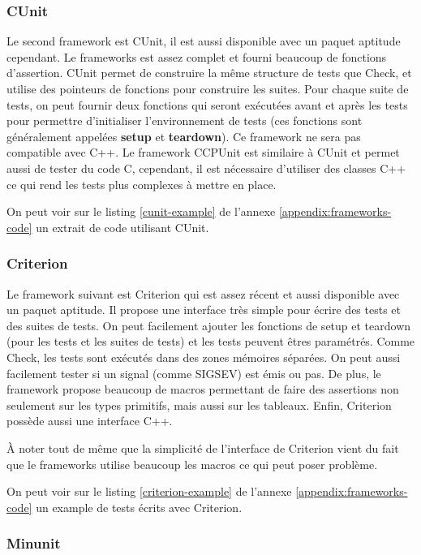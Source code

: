 \documentclass[a4paper]{article}
\begin{document}
\subsubsection*{CUnit}

Le second framework est CUnit, il est aussi disponible avec un paquet aptitude
cependant. Le frameworks est assez complet et fourni beaucoup de fonctions
d'assertion. CUnit permet de construire la même structure de tests que Check, et
utilise des pointeurs de fonctions pour construire les suites. Pour chaque suite
de tests, on peut fournir deux fonctions qui seront exécutées avant et après les
tests pour permettre d'initialiser l'environnement de tests (ces fonctions sont
généralement appelées \textbf{setup} et \textbf{teardown}). Ce framework ne sera
pas compatible avec C++. Le framework CCPUnit est similaire à CUnit et permet
aussi de tester du code C, cependant, il est nécessaire d'utiliser des classes
C++ ce qui rend les tests plus complexes à mettre en place.

On peut voir sur le listing \ref{cunit-example} de l'annexe
\ref{appendix:frameworks-code} un extrait de code utilisant CUnit.

\subsubsection*{Criterion}

Le framework suivant est Criterion qui est assez récent et aussi disponible avec
un paquet aptitude. Il propose une interface très simple pour écrire des tests
et des suites de tests. On peut facilement ajouter les fonctions de setup et
teardown (pour les tests et les suites de tests) et les tests peuvent êtres
paramétrés. Comme Check, les tests sont exécutés dans des zones mémoires
séparées. On peut aussi facilement tester si un signal (comme SIGSEV) est émis
ou pas. De plus, le framework propose beaucoup de macros permettant de faire des
assertions non seulement sur les types primitifs, mais aussi sur les tableaux.
Enfin, Criterion possède aussi une interface C++.

À noter tout de même que la simplicité de l'interface de Criterion vient du fait
que le frameworks utilise beaucoup les macros ce qui peut poser problème.

On peut voir sur le listing \ref{criterion-example} de l'annexe
\ref{appendix:frameworks-code} un example de tests écrits avec Criterion.

\subsubsection*{Minunit}
\end{document}
